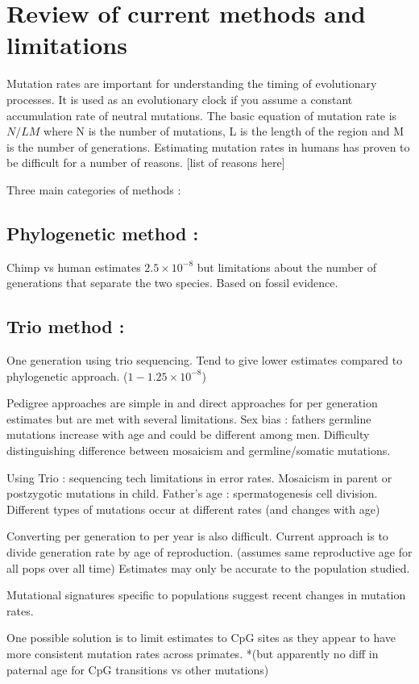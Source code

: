\documentclass[
11pt, %
oneside, %
english, %
doublespacing, %
headsepline, %
]{MastersDoctoralThesis} %
\begin{document}
\section{Review of current methods and limitations}

Mutation rates are important for understanding the timing of evolutionary processes.
It is used as an evolutionary clock if you assume a constant accumulation rate of neutral mutations.
The basic equation of mutation rate is $N / LM$ where N is the number of mutations, L is the length of the region and M is the number of generations.
Estimating mutation rates in humans has proven to be difficult for a number of reasons.
[list of reasons here]

Three main categories of methods :

\subsection{Phylogenetic method :} Chimp vs human estimates $2.5\times10^{-8}$ but limitations about the number of generations that separate the two species. Based on fossil evidence.

\subsection{Trio method :} One generation using trio sequencing. 
Tend to give lower estimates compared to phylogenetic approach. ($1-1.25\times10^{-8}$)

Pedigree approaches are simple in and direct approaches for per generation estimates but are met with several limitations.
Sex bias : fathers germline mutations increase with age and could be different among men.
Difficulty distinguishing difference between mosaicism and germline/somatic mutations.

Using Trio : sequencing tech limitations in error rates.
Mosaicism in parent or postzygotic mutations in child.
Father's age : spermatogenesis cell division.
Different types of mutations occur at different rates (and changes with age)

Converting per generation to per year is also difficult. 
Current approach is to divide generation rate by age of reproduction. (assumes same reproductive age for all pops over all time)
Estimates may only be accurate to the population studied. 

Mutational signatures specific to populations suggest recent changes in mutation rates. 

One possible solution is to limit estimates to CpG sites as they appear to have more consistent mutation rates across primates. *(but apparently no diff in paternal age for CpG transitions vs other mutations)
\end{document}
